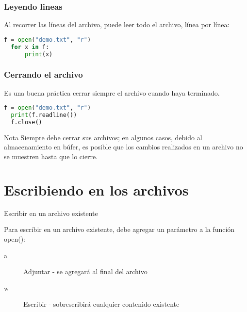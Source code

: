 \begin{frame}[fragile]
  \frametitle{Leyendo lineas}

  Al recorrer las líneas del archivo, puede leer todo el
  archivo, línea por línea:

  \vspace{\baselineskip}
  \begin{lstlisting}[language=Python]
  f = open("demo.txt", "r")
  for x in f:
      print(x)
  \end{lstlisting}
\end{frame}

\begin{frame}[fragile]
  \frametitle{Cerrando el archivo}

  Es una buena práctica cerrar siempre el archivo
  cuando haya terminado.

  \vspace{\baselineskip}
  \begin{lstlisting}[language=Python]
  f = open("demo.txt", "r")
  print(f.readline())
  f.close()
  \end{lstlisting}

  \pausa
  \begin{exampleblock}{Nota}
    Siempre debe cerrar sus archivos; en algunos casos,
    debido al almacenamiento en búfer, es posible que los
    cambios realizados en un archivo no se muestren hasta
    que lo cierre. 
  \end{exampleblock}
\end{frame}

\section{Escribiendo en los archivos}

\begin{frame}[c]{Escribir en un archivo existente}

  Para escribir en un archivo existente, debe agregar un
  parámetro a la función \textcolor{codeKeyword2}{open}():

  \vspace{\baselineskip}
  \begin{description}
    \item[a] Adjuntar - se agregará al final del archivo
    \item[w] Escribir - sobrescribirá cualquier contenido existente 
  \end{description}
\end{frame}

